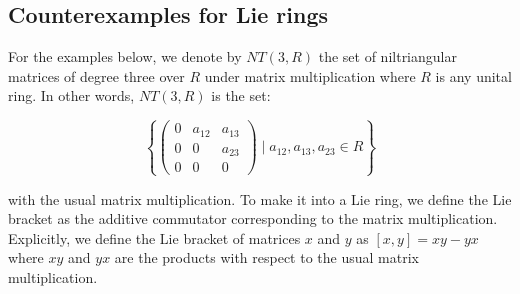 \documentclass{ucetd}
\begin{document}
\subsection{Counterexamples for Lie rings}

For the examples below, we denote by $NT(3,R)$ the set of
niltriangular matrices of degree three over $R$ under matrix
multiplication where $R$ is any unital ring. In other words, $NT(3,R)$
is the set:

$$\left \{\begin{pmatrix}
0 & a_{12} & a_{13} \\
0 & 0 & a_{23}\\
0 & 0 & 0\end{pmatrix} \mid a_{12},a_{13},a_{23} \in R \right \}$$

with the usual matrix multiplication. To make it into a Lie ring, we
define the Lie bracket as the additive commutator corresponding to the
matrix multiplication. Explicitly, we define the Lie bracket of
matrices $x$ and $y$ as $[x,y] = xy - yx$ where $xy$ and $yx$ are the
products with respect to the usual matrix multiplication.
\end{document}
